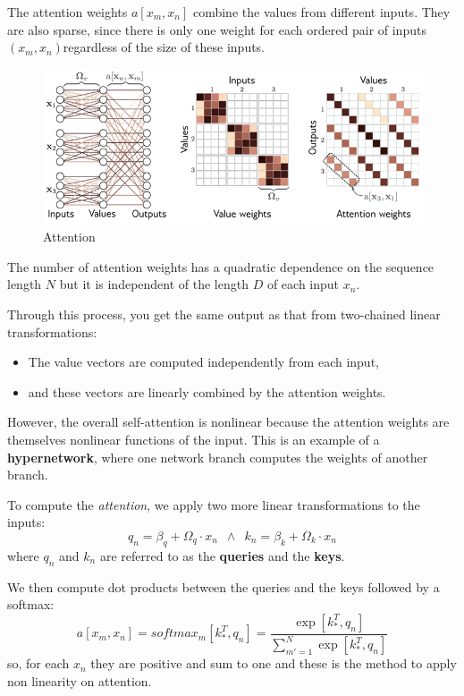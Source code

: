 The attention weights $a[x_m, x_n]$ combine the values from different inputs. They are also sparse, since there is only
one weight for each ordered pair of inputs $(x_m, x_n)$regardless of the size of these inputs.

\begin{figure}[!ht]
    \centering
    \includegraphics[width=\linewidth]{img/transformer/attention.png}
    \caption{Attention}
    \label{fig:enter-label}
\end{figure}

The number of attention weights has a quadratic dependence on the sequence length $N$ but it is independent of the length
$D$ of each input $x_n$.

Through this process, you get the same output as that from two-chained linear transformations:
\begin{itemize}
    \item The value vectors are computed independently from each input, 
    \item and these vectors are linearly combined by the attention weights.
\end{itemize}

However, the overall self-attention is nonlinear because the attention weights are themselves nonlinear functions of the 
input. This is an example of a \textbf{hypernetwork}, where one network branch computes the weights of another branch.

To compute the \textit{attention}, we apply two more linear transformations to the inputs: 
\begin{equation}
    q_n = \beta_q + \Omega_q \cdot x_n \,\,\, \land \,\,\, k_n = \beta_k + \Omega_k \cdot x_n
\end{equation}
where $q_n$ and $k_n$ are referred to as the \textbf{queries} and the \textbf{keys}. 

We then compute dot products between the queries and the keys followed by a softmax: 
\begin{equation}
    a[x_m, x_n] = softmax_m [k_\ast^T, q_n] = \frac{\exp[k_\ast^T, q_n]}{\sum_{m' = 1}^N \exp[k_\ast^T, q_n]}
\end{equation}
so, for each $x_n$ they are positive and sum to one and these is the method to apply
non linearity on attention.

